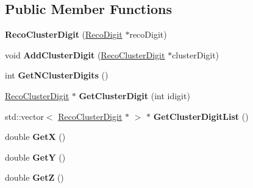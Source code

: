 \subsection*{Public Member Functions}
\begin{DoxyCompactItemize}
\item 
\hypertarget{classRecoClusterDigit_ac59d07b2db98358ce4ed64fd72a32dfd}{{\bfseries Reco\-Cluster\-Digit} (\hyperlink{classRecoDigit}{Reco\-Digit} $\ast$reco\-Digit)}\label{classRecoClusterDigit_ac59d07b2db98358ce4ed64fd72a32dfd}

\item 
\hypertarget{classRecoClusterDigit_aee05e7e05c85121caf3591514396f297}{void {\bfseries Add\-Cluster\-Digit} (\hyperlink{classRecoClusterDigit}{Reco\-Cluster\-Digit} $\ast$cluster\-Digit)}\label{classRecoClusterDigit_aee05e7e05c85121caf3591514396f297}

\item 
\hypertarget{classRecoClusterDigit_a301bdd08dbfe8ea9014746c5e3e841a2}{int {\bfseries Get\-N\-Cluster\-Digits} ()}\label{classRecoClusterDigit_a301bdd08dbfe8ea9014746c5e3e841a2}

\item 
\hypertarget{classRecoClusterDigit_ae522525d235f93a49e9aee48621605f4}{\hyperlink{classRecoClusterDigit}{Reco\-Cluster\-Digit} $\ast$ {\bfseries Get\-Cluster\-Digit} (int idigit)}\label{classRecoClusterDigit_ae522525d235f93a49e9aee48621605f4}

\item 
\hypertarget{classRecoClusterDigit_abe15c84c738b349800bedfa0ae04dc7e}{std\-::vector$<$ \hyperlink{classRecoClusterDigit}{Reco\-Cluster\-Digit} $\ast$ $>$ $\ast$ {\bfseries Get\-Cluster\-Digit\-List} ()}\label{classRecoClusterDigit_abe15c84c738b349800bedfa0ae04dc7e}

\item 
\hypertarget{classRecoClusterDigit_a1eb96b99e25a5c2ff6800fc3b7a3784e}{double {\bfseries Get\-X} ()}\label{classRecoClusterDigit_a1eb96b99e25a5c2ff6800fc3b7a3784e}

\item 
\hypertarget{classRecoClusterDigit_a0ae44933e670c6246d5880ac183a82b9}{double {\bfseries Get\-Y} ()}\label{classRecoClusterDigit_a0ae44933e670c6246d5880ac183a82b9}

\item 
\hypertarget{classRecoClusterDigit_ae24f94ba01ef8496a16710a16be59d42}{double {\bfseries Get\-Z} ()}\label{classRecoClusterDigit_ae24f94ba01ef8496a16710a16be59d42}


\end{DoxyCompactItemize}
